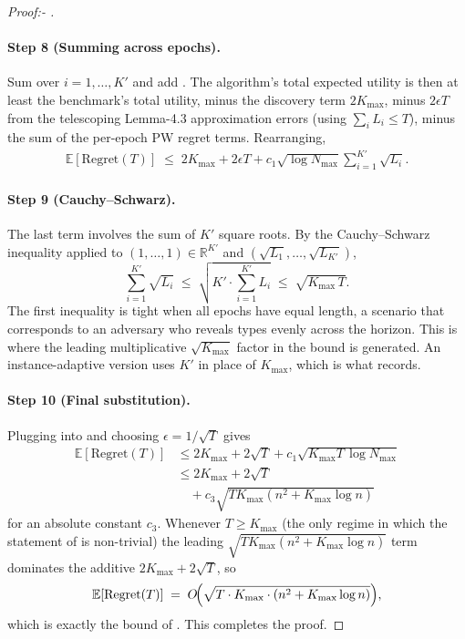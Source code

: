 \documentclass[letterpaper,9pt,twocolumn]{extarticle}
\newcommand{\EE}{\mathbb{E}}
\newcommand{\RR}{\mathbb{R}}
\newcommand{\Kmax}{K_{\max}}
\newcommand{\Nmax}{N_{\max}}
\newcommand{\Regret}{\mathrm{Regret}}
\theoremstyle{plain}
\theoremstyle{definition}
\theoremstyle{remark}
\begin{document}
\begin{proof}[Proof:- ]
\paragraph{Step 8 (Summing across epochs).}
Sum  over $i=1,\dots,K'$ and add
. The algorithm's total expected utility is then at
least the benchmark's total utility, minus the discovery term $2\Kmax$,
minus $2\epsilon T$ from the telescoping Lemma-4.3 approximation errors
(using $\sum_i L_i\le T$), minus the sum of the per-epoch PW regret
terms. Rearranging,
\begin{align}
\EE[\Regret(T)]\;\le\;2\Kmax+2\epsilon T+c_1\sqrt{\log\Nmax}\!\sum_{i=1}^{K'}\!\sqrt{L_i}.
\label{eq:after-sum}
\end{align}

\paragraph{Step 9 (Cauchy--Schwarz).}
The last term involves the sum of $K'$ square roots. By the Cauchy--Schwarz
inequality applied to $(1,\dots,1)\in\RR^{K'}$ and
$(\sqrt{L_1},\dots,\sqrt{L_{K'}})$,
\begin{equation}
\sum_{i=1}^{K'}\!\sqrt{L_i}\;\le\;\sqrt{K'\cdot\!\sum_{i=1}^{K'}\!L_i}\;\le\;\sqrt{\Kmax\,T}.
\label{eq:CS}
\end{equation}
The first inequality is tight when all epochs have equal length, a
scenario that corresponds to an adversary who reveals types evenly across
the horizon. This is where the leading multiplicative $\sqrt{\Kmax}$
factor in the bound is generated. An instance-adaptive version uses $K'$
in place of $\Kmax$, which is what  records.

\paragraph{Step 10 (Final substitution).}
Plugging  into  and choosing
$\epsilon=1/\sqrt T$ gives
\begin{align*}
\EE[\Regret(T)]&\le 2\Kmax+2\sqrt T+c_1\sqrt{\Kmax T\,\log\Nmax}\\
&\le 2\Kmax+2\sqrt T\\
&\quad+c_3\sqrt{T\Kmax(n^2+\Kmax\log n)}
\end{align*}
for an absolute constant $c_3$. Whenever $T\ge\Kmax$ (the only regime in
which the statement of  is non-trivial) the leading
$\sqrt{T\Kmax(n^2+\Kmax\log n)}$ term dominates the additive
$2\Kmax+2\sqrt T$, so
\[
\EE[\Regret(T)]\;=\;O\!\Bigl(\sqrt{T\cdot\Kmax\cdot(n^2+\Kmax\log n)}\Bigr),
\]
which is exactly the bound of . This completes the proof.
\end{proof}
\end{document}

